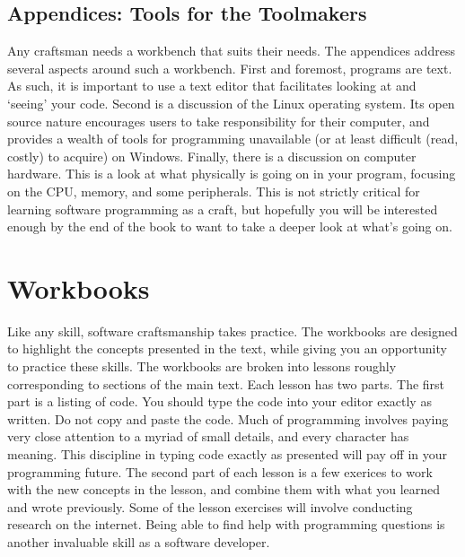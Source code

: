 \subsection{Appendices: Tools for the Toolmakers}

Any craftsman needs a workbench that suits their needs. The appendices address
several aspects around such a workbench. First and foremost, programs are
text. As such, it is important to use a text editor that facilitates looking
at and `seeing' your code. Second is a discussion of the Linux operating
system. Its open source nature encourages users to take responsibility for
their computer, and provides a wealth of tools for programming unavailable (or
at least difficult (read, costly) to acquire) on Windows. Finally, there is a
discussion on computer hardware. This is a look at what physically is going on
in your program, focusing on the CPU, memory, and some peripherals. This is
not strictly critical for learning software programming as a craft, but
hopefully you will be interested enough by the end of the book to want to take
a deeper look at what's going on.

\section{Workbooks}

Like any skill, software craftsmanship takes practice. The workbooks are
designed to highlight the concepts presented in the text, while giving you an
opportunity to practice these skills. The workbooks are broken into lessons
roughly corresponding to sections of the main text. Each lesson has two parts.
The first part is a listing of code. You should type the code into your editor
exactly as written. Do not copy and paste the code. Much of programming
involves paying very close attention to a myriad of small details, and every
character has meaning. This discipline in typing code exactly as presented
will pay off in your programming future. The second part of each lesson is a
few exerices to work with the new concepts in the lesson, and combine them
with what you learned and wrote previously. Some of the lesson exercises will
involve conducting research on the internet. Being able to find help with
programming questions is another invaluable skill as a software developer.
